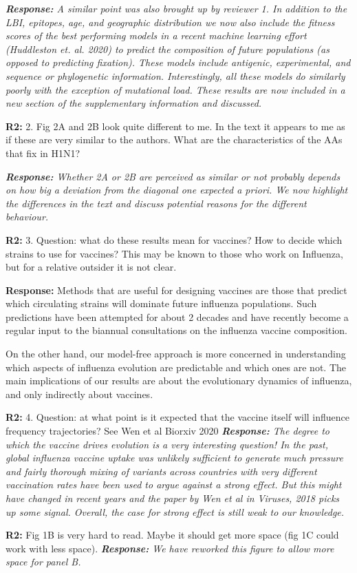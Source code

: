 \documentclass[aps,rmp,onecolumn]{revtex4-1}
\newcommand{\refb}[1]{\textbf{R2:} #1\vskip 5mm}
\newcommand{\response}[1]{{\it {\color{response}\textbf{Response:} #1}}\vskip 5mm}
\begin{document}
\response{
	A similar point was also brought up by reviewer 1.
	In addition to the LBI, epitopes, age, and geographic distribution we now also include the fitness scores of the best performing models in a recent machine learning effort (Huddleston \emph{et. al.} 2020) to predict the composition of future populations (as opposed to predicting fixation).
	These models include antigenic, experimental, and sequence or phylogenetic information.
	Interestingly, all these models do similarly poorly with the exception of mutational load.
	These results are now included in a new section of the supplementary information and discussed.
}

\refb{2. Fig 2A and 2B look quite different to me. In the text it appears to me as if these are very similar to the authors. What are the characteristics of the AAs that fix in H1N1? }

\response{Whether 2A or 2B are perceived as similar or not probably depends on how big a deviation from the diagonal one expected a priori.
We now highlight the differences in the text and discuss potential reasons for the different behaviour.  }


\refb{3. Question: what do these results mean for vaccines? How to decide which strains to use for vaccines? This may be known to those who work on Influenza, but for a relative outsider it is not clear. }

\response{
	Methods that are useful for designing vaccines are those that predict which circulating strains will dominate future influenza populations.
	Such predictions have been attempted for about 2 decades and have recently become a regular input to the biannual consultations on the influenza vaccine composition.

	On the other hand, our model-free approach is more concerned in understanding which aspects of influenza evolution are predictable and which ones are not.
	The main implications of our results are about the evolutionary dynamics of influenza, and only indirectly about vaccines.  
}

\refb{4. Question: at what point is it expected that the vaccine itself will influence frequency trajectories? See Wen et al Biorxiv 2020}
\response{
	The degree to which the vaccine drives evolution is a very interesting question!
	In the past, global influenza vaccine uptake was unlikely sufficient to generate much pressure and fairly thorough mixing of variants across countries with very different vaccination rates have been used to argue against a strong effect. But this might have changed in recent years and the paper by Wen et al in Viruses, 2018 picks up some signal.
	Overall, the case for strong effect is still weak to our knowledge.
}

\refb{Fig 1B is very hard to read. Maybe it should get more space (fig 1C could work with less space).}
\response{We have reworked this figure to allow more space for panel B.}
\end{document}
